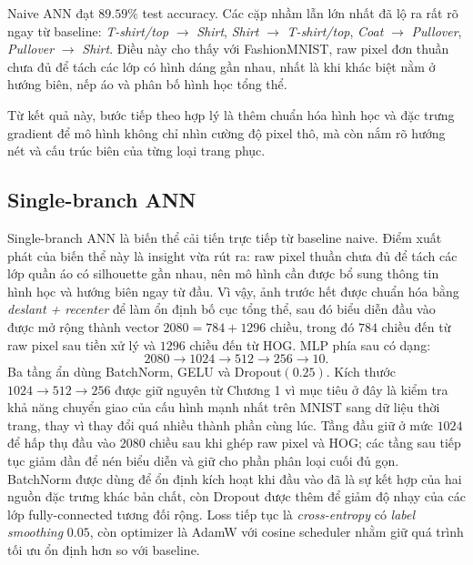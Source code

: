 

Naive ANN đạt $89.59\%$ test accuracy. Các cặp nhầm lẫn lớn nhất đã lộ ra rất rõ ngay từ baseline: \textit{T-shirt/top} $\rightarrow$ \textit{Shirt}, \textit{Shirt} $\rightarrow$ \textit{T-shirt/top}, \textit{Coat} $\rightarrow$ \textit{Pullover}, \textit{Pullover} $\rightarrow$ \textit{Shirt}. Điều này cho thấy với FashionMNIST, raw pixel đơn thuần chưa đủ để tách các lớp có hình dáng gần nhau, nhất là khi khác biệt nằm ở hướng biên, nếp áo và phân bố hình học tổng thể.

Từ kết quả này, bước tiếp theo hợp lý là thêm chuẩn hóa hình học và đặc trưng gradient để mô hình không chỉ nhìn cường độ pixel thô, mà còn nắm rõ hướng nét và cấu trúc biên của từng loại trang phục.

\subsection{Single-branch ANN}

Single-branch ANN là biến thể cải tiến trực tiếp từ baseline naive. Điểm xuất phát của biến thể này là insight vừa rút ra: raw pixel thuần chưa đủ để tách các lớp quần áo có silhouette gần nhau, nên mô hình cần được bổ sung thông tin hình học và hướng biên ngay từ đầu. Vì vậy, ảnh trước hết được chuẩn hóa bằng \textit{deslant + recenter} để làm ổn định bố cục tổng thể, sau đó biểu diễn đầu vào được mở rộng thành vector $2080 = 784 + 1296$ chiều, trong đó $784$ chiều đến từ raw pixel sau tiền xử lý và $1296$ chiều đến từ HOG. MLP phía sau có dạng:
\[
2080 \rightarrow 1024 \rightarrow 512 \rightarrow 256 \rightarrow 10.
\]
Ba tầng ẩn dùng BatchNorm, GELU và Dropout$(0.25)$. Kích thước $1024 \rightarrow 512 \rightarrow 256$ được giữ nguyên từ Chương 1 vì mục tiêu ở đây là kiểm tra khả năng chuyển giao của cấu hình mạnh nhất trên MNIST sang dữ liệu thời trang, thay vì thay đổi quá nhiều thành phần cùng lúc. Tầng đầu giữ ở mức $1024$ để hấp thụ đầu vào $2080$ chiều sau khi ghép raw pixel và HOG; các tầng sau tiếp tục giảm dần để nén biểu diễn và giữ cho phần phân loại cuối đủ gọn. BatchNorm được dùng để ổn định kích hoạt khi đầu vào đã là sự kết hợp của hai nguồn đặc trưng khác bản chất, còn Dropout được thêm để giảm độ nhạy của các lớp fully-connected tương đối rộng. Loss tiếp tục là \textit{cross-entropy} có \textit{label smoothing} $0.05$, còn optimizer là AdamW với cosine scheduler nhằm giữ quá trình tối ưu ổn định hơn so với baseline.



